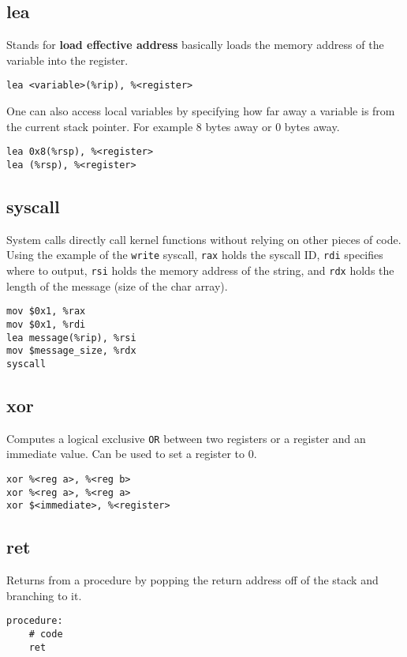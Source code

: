 \documentclass[reqno,a4paper,11pt]{amsart}
\begin{document}
\subsection{lea}
Stands for \textbf{load effective address} basically loads the memory address
of the variable into the register.
\begin{lstlisting}
lea <variable>(%rip), %<register>
\end{lstlisting}
One can also access local variables by specifying how far away a variable is
from the current stack pointer. For example 8 bytes away or 0 bytes away.
\begin{lstlisting}
lea 0x8(%rsp), %<register>
lea (%rsp), %<register>
\end{lstlisting}
\subsection{syscall}
System calls directly call kernel functions without relying on other pieces of
code. Using the example of the \texttt{write} syscall, \texttt{rax} holds the 
syscall ID, \texttt{rdi} specifies where to output, \texttt{rsi} holds the 
memory address of the string, and \texttt{rdx} holds the length of the message 
(size of the char array).
\begin{lstlisting}
mov $0x1, %rax
mov $0x1, %rdi
lea message(%rip), %rsi
mov $message_size, %rdx
syscall
\end{lstlisting}
\subsection{xor}
Computes a logical exclusive \texttt{OR} between two registers or a register
and an immediate value. Can be used to set a register to 0.
\begin{lstlisting}
xor %<reg a>, %<reg b>
xor %<reg a>, %<reg a>
xor $<immediate>, %<register>
\end{lstlisting}
\subsection{ret}
Returns from a procedure by popping the return address off of the stack and
branching to it.
\begin{lstlisting}
procedure:
    # code
    ret
\end{lstlisting}
\end{document}

